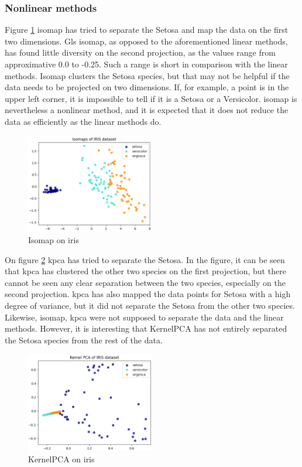 \subsubsection{Nonlinear methods}\label{subsubsec:nonlinear-methods-on-iris}
Figure \ref{fig:iris-isomap} \gls{isomap} has tried to separate the Setosa and map the data on the first two dimensions. Gls {isomap}, as opposed to the aforementioned linear methods, has found little diversity on the second projection, as the values range from approximative 0.0 to -0.25. Such a range is short in comparison with the linear methods. Isomap clusters the Setosa species, but that may not be helpful if the data needs to be projected on two dimensions. If, for example, a point is in the upper left corner, it is impossible to tell if it is a Setosa or a Versicolor. \gls{isomap} is nevertheless a nonlinear method, and it is expected that it does not reduce the data as efficiently as the linear methods do.

\begin{figure}[htb!]
    \centering
    \includegraphics[width=0.5\textwidth]{figures/theory-example-figures/iris-isomap.png}
    \caption{Isomap on iris}
    \label{fig:iris-isomap}
    \end{figure}

On figure \ref{fig:iris-kernelpca} \gls{kpca} has tried to separate the Setosa. In the figure, it can be seen that \gls{kpca} has clustered the other two species on the first projection, but there cannot be seen any clear separation between the two species, especially on the second projection. \gls{kpca} has also mapped the data points for Setosa with a high degree of variance, but it did not separate the Setosa from the other two species. Likewise, \gls{isomap}, \gls{kpca} were not supposed to separate the data and the linear methods. However, it is interesting that KernelPCA has not entirely separated the Setosa species from the rest of the data.

\begin{figure}[htb!]
    \centering
    \includegraphics[width=0.5\textwidth]{figures/theory-example-figures/iris-kernelpca.png}
    \caption{KernelPCA on iris}
    \label{fig:iris-kernelpca}
    \end{figure}


